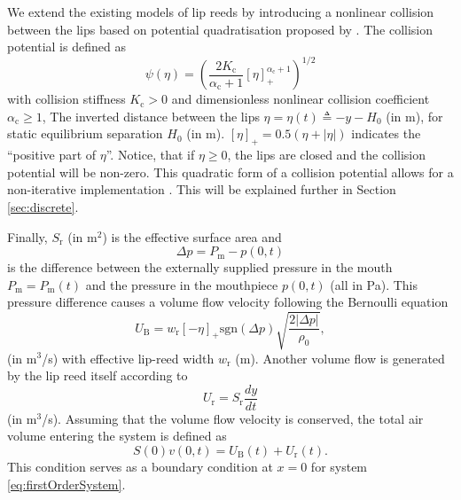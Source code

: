 We extend the existing models of lip reeds \cite{campbell2004brass} by introducing a nonlinear collision between the lips based on potential quadratisation proposed by \cite{Ducceschi2021}. The collision potential is defined as
\begin{equation}
    \psi(\eta) = \left(\frac{2K_\text{c}}{\alpha_\text{c}+1}[\eta]_+^{\alpha_\text{c}+1}
    \right)^{1/2}
\end{equation}
with collision stiffness $K_\text{c}>0$ and dimensionless nonlinear collision coefficient $\alpha_\text{c}\geq 1$, The inverted distance between the lips $\eta = \eta(t) \triangleq -y-H_0$ (in m), for static equilibrium separation $H_0$ (in m). $[\eta]_+ = 0.5 (\eta + |\eta|)$ indicates the ``positive part of $\eta$''. Notice, that if $\eta 
\geq 0$, the lips are closed and the collision potential will be non-zero. This quadratic form of a collision potential allows for a non-iterative implementation \cite{Ducceschi2021}. This will be explained further in Section \ref{sec:discrete}.

Finally, $S_\text{r}$ (in m$^2$) is the effective surface area and 
\begin{equation}
    \Delta p = P_\text{m} - p(0,t)
\end{equation}
is the difference between the externally supplied pressure in the mouth $P_\text{m} = P_\text{m}(t)$ and the pressure in the mouthpiece $p(0, t)$ (all in Pa). This pressure difference causes a volume flow velocity following the Bernoulli equation
\begin{equation}
    U_\text{B} = w_\text{r}[-\eta]_+\text{sgn}(\Delta p) \sqrt{\frac{2|\Delta p|}{\rho_0}},
\end{equation}
(in m$^3$/s) with effective lip-reed width $w_\text{r}$ (m). %
Another volume flow is generated by the lip reed itself according to
\begin{equation}
    U_\text{r} = S_\text{r} \frac{dy}{dt}
\end{equation}
(in m$^3$/s).
Assuming that the volume flow velocity is conserved, the total air volume entering the system is defined as
\begin{equation}\label{eq:lipBoundary}
    S(0)v(0,t) = U_\text{B}(t) + U_\text{r}(t).
\end{equation}
This condition serves as a boundary condition at $x=0$ for system \eqref{eq:firstOrderSystem}.



